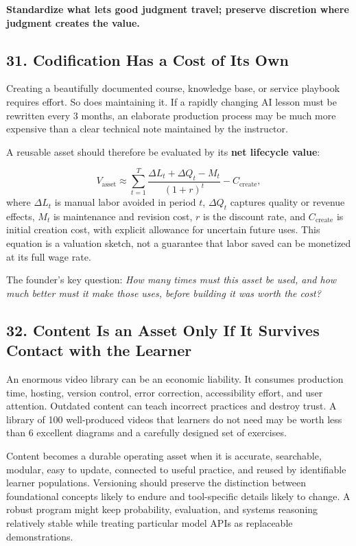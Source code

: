 \textbf{Standardize what lets good judgment travel; preserve discretion where judgment creates the value.}

\subsection*{31. Codification Has a Cost of Its Own}

Creating a beautifully documented course, knowledge base, or service playbook requires effort. So does maintaining it. If a rapidly changing AI lesson must be rewritten every 3 months, an elaborate production process may be much more expensive than a clear technical note maintained by the instructor.

A reusable asset should therefore be evaluated by its \textbf{net lifecycle value}:

\begin{equation}
V_{\text{asset}} \approx \sum_{t=1}^T \frac{\Delta L_t + \Delta Q_t - M_t}{(1+r)^t} - C_{\text{create}},
\end{equation}
where $\Delta L_t$ is manual labor avoided in period $t$, $\Delta Q_t$ captures quality or revenue effects, $M_t$ is maintenance and revision cost, $r$ is the discount rate, and $C_{\text{create}}$ is initial creation cost, with explicit allowance for uncertain future uses. This equation is a valuation sketch, not a guarantee that labor saved can be monetized at its full wage rate.

The founder's key question: \emph{How many times must this asset be used, and how much better must it make those uses, before building it was worth the cost?}

\subsection*{32. Content Is an Asset Only If It Survives Contact with the Learner}

An enormous video library can be an economic liability. It consumes production time, hosting, version control, error correction, accessibility effort, and user attention. Outdated content can teach incorrect practices and destroy trust. A library of 100 well-produced videos that learners do not need may be worth less than 6 excellent diagrams and a carefully designed set of exercises.

Content becomes a durable operating asset when it is accurate, searchable, modular, easy to update, connected to useful practice, and reused by identifiable learner populations. Versioning should preserve the distinction between foundational concepts likely to endure and tool-specific details likely to change. A robust program might keep probability, evaluation, and systems reasoning relatively stable while treating particular model APIs as replaceable demonstrations.

